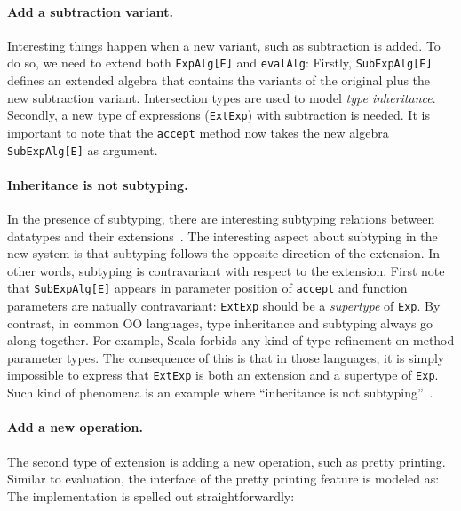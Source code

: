 \paragraph{Add a subtraction variant.} Interesting things happen when a new
variant, such as subtraction is added. To do so, we need to extend both
\lstinline{ExpAlg[E]} and \lstinline{evalAlg}:
Firstly, \lstinline{SubExpAlg[E]} defines an extended algebra that contains the
variants of the original plus the new subtraction variant. Intersection types
are used to model \textit{type inheritance}. Secondly, a new type of expressions
(\lstinline{ExtExp}) with subtraction is needed. It is important to note that
the \lstinline{accept} method now takes the new algebra \lstinline{SubExpAlg[E]}
as argument.

\paragraph{Inheritance is not subtyping.} In the presence of subtyping, there
are interesting subtyping relations between datatypes and their
extensions~\cite{oliveira09modular}. The interesting aspect about subtyping in
the new system is that subtyping follows the opposite direction of the
extension. In other words, subtyping is contravariant with respect to the
extension. First note that \lstinline{SubExpAlg[E]} appears in parameter
position of \lstinline{accept} and function parameters are natually
contravariant: \lstinline{ExtExp} should be a \textit{supertype} of
\lstinline{Exp}. By contrast, in common OO languages, type inheritance and
subtyping always go along together. For example, Scala forbids any kind of
type-refinement on method parameter types. The consequence of this is that in
those languages, it is simply impossible to express that \lstinline{ExtExp} is
both an extension and a supertype of \lstinline{Exp}. Such kind of phenomena is
an example where ``inheritance is not subtyping''~\cite{cook1989inheritance}.

\paragraph{Add a new operation.} The second type of extension is adding a new
operation, such as pretty printing. Similar to evaluation, the interface of the
pretty printing feature is modeled as:
The implementation is spelled out straightforwardly:


